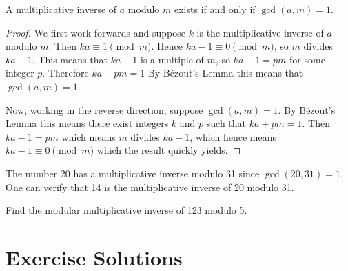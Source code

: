 \begin{proposition}\label{prop-multiplicative-inverse-exists-iff-coprime}
    A multiplicative inverse of $a$ modulo $m$ exists if and only if $\gcd(a,m) = 1$.
\end{proposition}
\begin{proof}
    We first work forwards and suppose $k$ is the multiplicative inverse of $a$ modulo $m$. Then $ka \equiv 1 \pmod m$. Hence $ka - 1 \equiv 0 \pmod m$, so $m$ divides $ka - 1$. This means that $ka - 1$ is a multiple of $m$, so $ka - 1 = pm$ for some integer $p$. Therefore $ka + pm = 1$ By B\'{e}zout's Lemma  this means that $\gcd(a, m) = 1$.
    
    Now, working in the reverse direction, suppose $\gcd(a, m) = 1$. By B\'{e}zout's Lemma this means there exist integers $k$ and $p$ such that $ka + pm = 1$. Then $ka - 1 = pm$ which means $m$ divides $ka - 1$, which hence means $ka - 1 \equiv 0 \pmod m$ which the result quickly yields.
\end{proof}

\begin{example}
    The number 20 has a multiplicative inverse modulo 31 since $\gcd(20, 31) = 1$. One can verify that 14 is the multiplicative inverse of 20 modulo 31.
\end{example}

\begin{exercise}
    Find the modular multiplicative inverse of 123 modulo 5.
\end{exercise}

\appendix
\chapter{Exercise Solutions}

